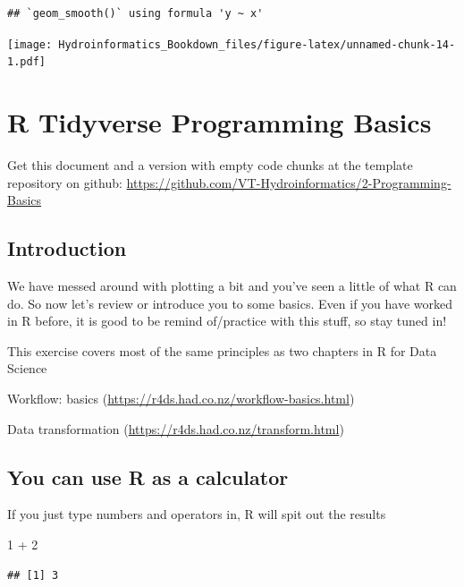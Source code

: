 \documentclass[
]{book}
\newenvironment{Shaded}{\begin{snugshade}}{\end{snugshade}}
\newcommand{\DecValTok}[1]{\textcolor[rgb]{0.00,0.00,0.81}{#1}}
\newcommand{\SpecialCharTok}[1]{\textcolor[rgb]{0.00,0.00,0.00}{#1}}
\begin{document}
\begin{verbatim}
## `geom_smooth()` using formula 'y ~ x'
\end{verbatim}

\texttt{[image: Hydroinformatics\_Bookdown\_files/figure-latex/unnamed-chunk-14-1.pdf]}

\hypertarget{Programming}{%
\chapter{R Tidyverse Programming Basics}\label{Programming}}

Get this document and a version with empty code chunks at the template repository on github: \url{https://github.com/VT-Hydroinformatics/2-Programming-Basics}

\hypertarget{introduction-1}{%
\section{Introduction}\label{introduction-1}}

We have messed around with plotting a bit and you've seen a little of what R can do. So now let's review or introduce you to some basics. Even if you have worked in R before, it is good to be remind of/practice with this stuff, so stay tuned in!

This exercise covers most of the same principles as two chapters in R for Data Science

Workflow: basics (\url{https://r4ds.had.co.nz/workflow-basics.html})

Data transformation (\url{https://r4ds.had.co.nz/transform.html})

\hypertarget{you-can-use-r-as-a-calculator}{%
\section{You can use R as a calculator}\label{you-can-use-r-as-a-calculator}}

If you just type numbers and operators in, R will spit out the results

\begin{Shaded}
\begin{Highlighting}[]
\DecValTok{1} \SpecialCharTok{+} \DecValTok{2}
\end{Highlighting}
\end{Shaded}

\begin{verbatim}
## [1] 3
\end{verbatim}
\end{document}
